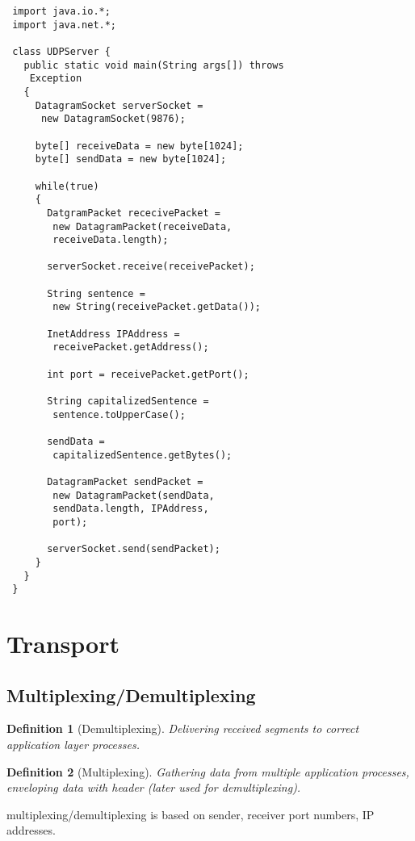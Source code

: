 \documentclass[10pt, a4paper, twocolumn]{scrartcl}
\newtheorem{definition}{Definition}
\begin{document}
\begin{verbatim}
 import java.io.*;
 import java.net.*;

 class UDPServer {
   public static void main(String args[]) throws
    Exception
   {
     DatagramSocket serverSocket =
      new DatagramSocket(9876);

     byte[] receiveData = new byte[1024];
     byte[] sendData = new byte[1024];

     while(true)
     {
       DatgramPacket rececivePacket =
        new DatagramPacket(receiveData,
        receiveData.length);

       serverSocket.receive(receivePacket);

       String sentence =
        new String(receivePacket.getData());

       InetAddress IPAddress =
        receivePacket.getAddress();

       int port = receivePacket.getPort();
       
       String capitalizedSentence =
        sentence.toUpperCase();
       
       sendData =
        capitalizedSentence.getBytes();
       
       DatagramPacket sendPacket =
        new DatagramPacket(sendData,
        sendData.length, IPAddress,
        port);
       
       serverSocket.send(sendPacket);
     }
   }
 }
\end{verbatim}


\section{Transport}

\subsection{Multiplexing/Demultiplexing}

\begin{definition}[Demultiplexing]
	Delivering received segments to correct application layer processes.
\end{definition}

\begin{definition}[Multiplexing]
	Gathering data from multiple application processes, enveloping data with header (later used for demultiplexing).
\end{definition}

multiplexing/demultiplexing is based on sender, receiver port numbers, IP addresses.
\end{document}
